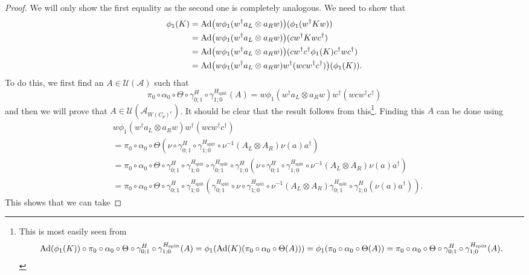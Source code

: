 \documentclass[12pt,a4paper,twoside]{article}
\let\originalleft\left
\let\originalright\right
\renewcommand{\left}{\mathopen{}\mathclose\bgroup\originalleft}
\renewcommand{\right}{\aftergroup\egroup\originalright}
\newcommand{\UU}{\mathcal U}
\renewcommand{\AA}{\mathcal A}
\newcommand{\Ad}[1]{\textrm{Ad}\left(#1\right)}
\theoremstyle{definition}
\numberwithin{equation}{section}
\begin{document}
\begin{proof}
	We will only show the first equality as the second one is completely analogous. We need to show that
	\begin{align}
		\phi_1(K)&=\Ad{w\phi_1(w^\dagger a_L\otimes a_R w)}(\phi_1(w^\dagger K w))\\
		&=\Ad{w\phi_1(w^\dagger a_L\otimes a_R w)}(cw^\dagger K wc^\dagger)\\
		&=\Ad{w\phi_1(w^\dagger a_L\otimes a_R w)}(cw^\dagger c^\dagger \phi_1(K) c^\dagger wc^\dagger)\\
		&=\Ad{w\phi_1(w^\dagger a_L\otimes a_R w)w^\dagger (w cw^\dagger c^\dagger)}(\phi_1(K)).
	\end{align}
	To do this, we first find an $A\in\UU(\AA)$ such that
	\begin{equation}
		\pi_0\circ\alpha_0\circ\Theta\circ\gamma^H_{0;1}\circ\gamma^{H_\text{split}}_{1;0}(A)=w\phi_1(w^\dagger a_L\otimes a_R w)w^\dagger (w cw^\dagger c^\dagger)
	\end{equation}
	and then we will prove that $A\in\UU(\AA_{W(C_\theta)^c})$. It should be clear that the result follows from this\footnote{This is most easily seen from\begin{equation}
			\Ad{\phi_1(K)}\circ\pi_0\circ\alpha_0\circ\Theta\circ\gamma^H_{0;1}\circ\gamma^{H_\text{split}}_{1;0}(A)=\phi_1(\Ad{K}(\pi_0\circ\alpha_0\circ\Theta(A)))=\phi_1(\pi_0\circ\alpha_0\circ\Theta(A))=\pi_0\circ\alpha_0\circ\Theta\circ\gamma^H_{0;1}\circ\gamma^{H_\text{split}}_{1;0}(A).
	\end{equation}}. Finding this $A$ can be done using
	\begin{align}
		&w\phi_1(w^\dagger a_L\otimes a_R w)w^\dagger (w cw^\dagger c^\dagger)\\
		&=\pi_0\circ\alpha_0\circ\Theta(\nu\circ\gamma^H_{0;1}\circ\gamma^{H_\text{split}}_{1;0}\circ\nu^{-1}(A_L\otimes A_R)\nu(a)a^\dagger)\\
		&=\pi_0\circ\alpha_0\circ\Theta\circ\gamma^H_{0;1}\circ\gamma^{H_\text{split}}_{1;0}\circ\gamma^{H_\text{split}}_{0;1}\circ\gamma^H_{1;0}(\nu\circ\gamma^H_{0;1}\circ\gamma^{H_\text{split}}_{1;0}\circ\nu^{-1}(A_L\otimes A_R)\nu(a)a^\dagger)\\
		&=\pi_0\circ\alpha_0\circ\Theta\circ\gamma^H_{0;1}\circ\gamma^{H_\text{split}}_{1;0}(\gamma^{H_\text{split}}_{0;1}\circ\nu\circ\gamma^{H_\text{split}}_{1;0}\circ\nu^{-1}(A_L\otimes A_R)\gamma^{H_\text{split}}_{0;1}\circ\gamma^H_{1;0}(\nu(a)a^\dagger)).
	\end{align}
	This shows that we can take

\end{proof}
\end{document}
